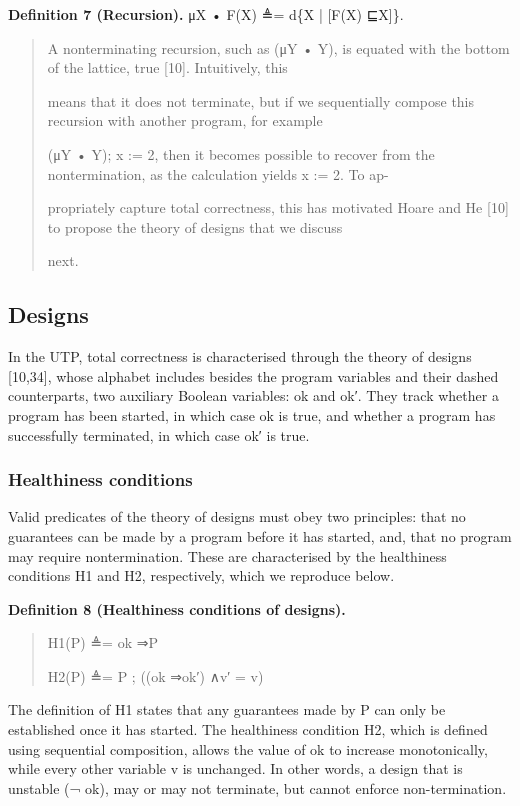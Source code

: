 \documentclass[11pt]{article}
\begin{document}
\noindent\textbf{Definition 7 (Recursion).} μX • F(X) ≜= d\{X | [F(X) ⊑X]\}.


\begin{quote}\small\raggedright
A nonterminating recursion, such as (μY • Y), is equated with the bottom of the lattice, true [10]. Intuitively, this
\par
means that it does not terminate, but if we sequentially compose this recursion with another program, for example
\par
(μY • Y); x := 2, then it becomes possible to recover from the nontermination, as the calculation yields x := 2. To ap-
\par
propriately capture total correctness, this has motivated Hoare and He [10] to propose the theory of designs that we discuss
\par
next.
\end{quote}

\subsection{Designs}
In the UTP, total correctness is characterised through the theory of designs [10,34], whose alphabet includes besides the program variables and their dashed counterparts, two auxiliary Boolean variables: ok and ok′. They track whether a program has been started, in which case ok is true, and whether a program has successfully terminated, in which case ok′ is true.

\subsubsection{Healthiness conditions}
Valid predicates of the theory of designs must obey two principles: that no guarantees can be made by a program before it has started, and, that no program may require nontermination. These are characterised by the healthiness conditions H1 and H2, respectively, which we reproduce below.

\noindent\textbf{Definition 8 (Healthiness conditions of designs).}


\begin{quote}\small\raggedright
H1(P) ≜= ok ⇒P
\par
H2(P) ≜= P ; ((ok ⇒ok′) ∧v′ = v)
\end{quote}

The definition of H1 states that any guarantees made by P can only be established once it has started. The healthiness condition H2, which is defined using sequential composition, allows the value of ok to increase monotonically, while every other variable v is unchanged. In other words, a design that is unstable (¬ ok), may or may not terminate, but cannot enforce non-termination.
\end{document}
